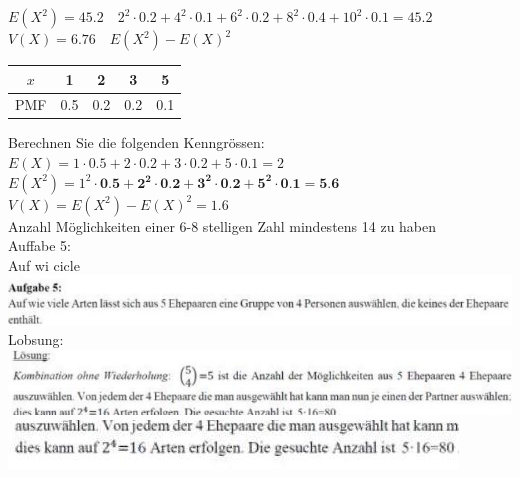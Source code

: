 \documentclass[10pt]{article}
\begin{document}
$E\left(X^{2}\right)=45.2 \quad 2^{2} \cdot 0.2+4^{2} \cdot 0.1+6^{2} \cdot 0.2+8^{2} \cdot 0.4+10^{2} \cdot 0.1=45.2$\\
$V(X)=6.76 \quad E\left(X^{2}\right)-E(X)^{2}$

\begin{center}
\begin{tabular}{|c|c|c|c|c|}
\hline
$x$ & 1 & 2 & 3 & 5 \\
\hline
PMF & 0.5 & 0.2 & 0.2 & 0.1 \\
\hline
\end{tabular}
\end{center}

Berechnen Sie die folgenden Kenngrössen:\\
$E(X)=1 \cdot 0.5+2 \cdot 0.2+3 \cdot 0.2+5 \cdot 0.1=2$\\
$E\left(X^{2}\right)=1^{2} \cdot \mathbf{0 . 5 + 2 ^ { 2 } \cdot 0 . 2 + \mathbf { 3 } ^ { 2 } \cdot 0 . 2 + \mathbf { 5 } ^ { 2 } \cdot 0 . 1 = 5 . 6}$\\
$V(X)=E\left(X^{2}\right)-E(X)^{2}=1.6$\\
Anzahl Möglichkeiten einer 6-8 stelligen Zahl mindestens 14 zu haben\\
Auffabe 5:\\
Auf wi cicle\\
\includegraphics[max width=\textwidth, center]{2024_12_29_0906b02acf849bda8665g-3(4)}\\
Lobsung:\\
\includegraphics[max width=\textwidth, center]{2024_12_29_0906b02acf849bda8665g-3(10)}\\
\includegraphics[max width=\textwidth, center]{2024_12_29_0906b02acf849bda8665g-3(5)}
\end{document}
